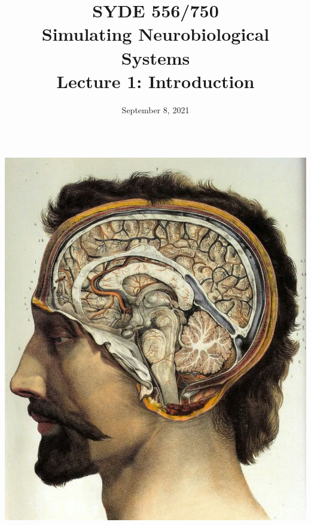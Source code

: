 \documentclass[handout,aspectratio=169]{beamer}
\date{September 8, 2021}
\title{SYDE 556/750 \\ Simulating Neurobiological Systems \\ Lecture 1: Introduction}
\begin{document}
	
\begin{frame}{}
	\vspace{0.5cm}
	\begin{columns}[c]
		\MakeTitle
		\includegraphics[width=\textwidth]{media/jean_baptiste_marc_bourgery_atlas_of_anatomy_human_brain.jpg}
	\end{columns}
\end{frame}
\end{document}
